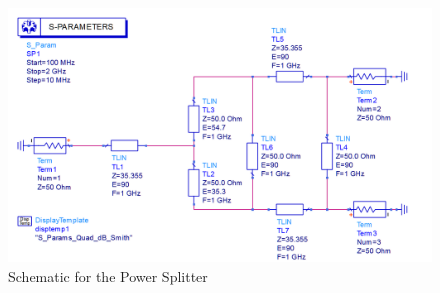 \begin{figure}[H]
    \centering
    \includegraphics[width=0.8\linewidth]{img/Problem3/PowerSplitterSchematic.PNG}
    \caption{Schematic for the Power Splitter}
    \label{fig:img/Problem3/PowerSplitterSchematic}
\end{figure}
